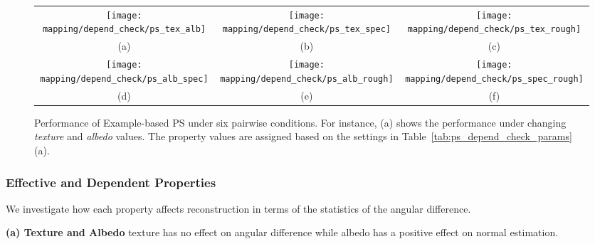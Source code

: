\begin{sidewaysfigure}[!htbp]
\begin{tabular}{ccc}
\texttt{[image: mapping/depend\_check/ps\_tex\_alb]}&
\texttt{[image: mapping/depend\_check/ps\_tex\_spec]}&
\texttt{[image: mapping/depend\_check/ps\_tex\_rough]}\\
(a) & (b) &(c)\\
\texttt{[image: mapping/depend\_check/ps\_alb\_spec]}&
\texttt{[image: mapping/depend\_check/ps\_alb\_rough]}&
\texttt{[image: mapping/depend\_check/ps\_spec\_rough]}\\
(d) & (e) & (f)\\
\end{tabular}
\caption{Performance of Example-based PS under six pairwise conditions. For instance, (a) shows the performance under changing \textit{texture} and \textit{albedo} values. The property values are assigned based on the settings in Table~\ref{tab:ps_depend_check_params} (a).}
\label{fig:ps_depend_check}
\end{sidewaysfigure}

\subsubsection{Effective and Dependent Properties}
We investigate how each property affects reconstruction in terms of the statistics of the angular difference.

\textbf{(a) Texture and Albedo} 
texture has no effect on angular difference while albedo has a positive effect on normal estimation.

